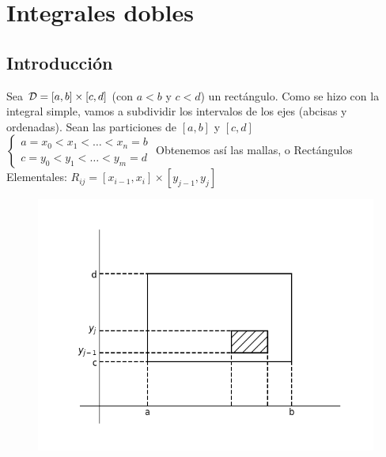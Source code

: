 \documentclass{report}
\begin{document}
\chapter{Integrales dobles}
  \section{Introducción}
    \noindent Sea $\mathcal{D}=\left[a,b\right]\times\left[c,d\right]$ (con $a<b$ y $c<d$)
    un rectángulo. Como se hizo con la integral simple, vamos a subdividir
    los intervalos de los ejes (abcisas y ordenadas). Sean las particiones de
    $\left[a,b\right]$ y $\left[c,d\right]$\\ \setlength\extrarowheight{0pt}
    $\begin{cases}a=x_0<x_1<\hdots<x_n=b\\c=y_0<y_1<\hdots<y_m=d\end{cases}$
    Obtenemos así las mallas, o Rectángulos Elementales:
    $R_{ij}=\left[x_{i-1},x_i\right]\times\left[y_{j-1},y_j\right]$
    \begin{figure}
      \hspace{-0.3cm}
      \includegraphics[width=.4\textwidth]{integralesdobles.png}
    \end{figure}
    \clearpage
\end{document}
